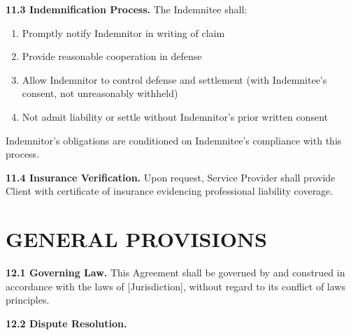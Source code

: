 \documentclass[11pt,a4paper]{article}
\begin{document}
\textbf{11.3 Indemnification Process.} The Indemnitee shall:

\begin{enumerate}[label=\alph*)]
\item Promptly notify Indemnitor in writing of claim
\item Provide reasonable cooperation in defense
\item Allow Indemnitor to control defense and settlement (with Indemnitee's consent, not unreasonably withheld)
\item Not admit liability or settle without Indemnitor's prior written consent
\end{enumerate}

Indemnitor's obligations are conditioned on Indemnitee's compliance with this process.

\textbf{11.4 Insurance Verification.} Upon request, Service Provider shall provide Client with certificate of insurance evidencing professional liability coverage.

\section{GENERAL PROVISIONS}

\textbf{12.1 Governing Law.} This Agreement shall be governed by and construed in accordance with the laws of [Jurisdiction], without regard to its conflict of laws principles.

\textbf{12.2 Dispute Resolution.}
\end{document}
